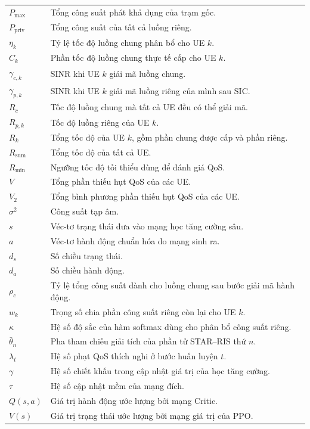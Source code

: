 \begin{longtable}{@{}l p{11.2cm}@{}}
$P_{\max}$ & Tổng công suất phát khả dụng của trạm gốc. \\
$P_{\mathrm{priv}}$ & Tổng công suất của tất cả luồng riêng. \\
$\eta_k$ & Tỷ lệ tốc độ luồng chung phân bổ cho UE $k$. \\
$C_k$ & Phần tốc độ luồng chung thực tế cấp cho UE $k$. \\
$\gamma_{c,k}$ & SINR khi UE $k$ giải mã luồng chung. \\
$\gamma_{p,k}$ & SINR khi UE $k$ giải mã luồng riêng của mình sau SIC. \\
$R_c$ & Tốc độ luồng chung mà tất cả UE đều có thể giải mã. \\
$R_{p,k}$ & Tốc độ luồng riêng của UE $k$. \\
$R_k$ & Tổng tốc độ của UE $k$, gồm phần chung được cấp và phần riêng. \\
$R_{\mathrm{sum}}$ & Tổng tốc độ của tất cả UE. \\
$R_{\min}$ & Ngưỡng tốc độ tối thiểu dùng để đánh giá QoS. \\
$V$ & Tổng phần thiếu hụt QoS của các UE. \\
$V_2$ & Tổng bình phương phần thiếu hụt QoS của các UE. \\
$\sigma^2$ & Công suất tạp âm. \\
$s$ & Véc-tơ trạng thái đưa vào mạng học tăng cường sâu. \\
$a$ & Véc-tơ hành động chuẩn hóa do mạng sinh ra. \\
$d_s$ & Số chiều trạng thái. \\
$d_a$ & Số chiều hành động. \\
$\rho_c$ & Tỷ lệ tổng công suất dành cho luồng chung sau bước giải mã hành động. \\
$w_k$ & Trọng số chia phần công suất riêng còn lại cho UE $k$. \\
$\kappa$ & Hệ số độ sắc của hàm softmax dùng cho phân bổ công suất riêng. \\
$\bar{\theta}_n$ & Pha tham chiếu giải tích của phần tử STAR--RIS thứ $n$. \\
$\lambda_t$ & Hệ số phạt QoS thích nghi ở bước huấn luyện $t$. \\
$\gamma$ & Hệ số chiết khấu trong cập nhật giá trị của học tăng cường. \\
$\tau$ & Hệ số cập nhật mềm của mạng đích. \\
$Q(s,a)$ & Giá trị hành động ước lượng bởi mạng Critic. \\
$V(s)$ & Giá trị trạng thái ước lượng bởi mạng giá trị của PPO. \\
\end{longtable}

